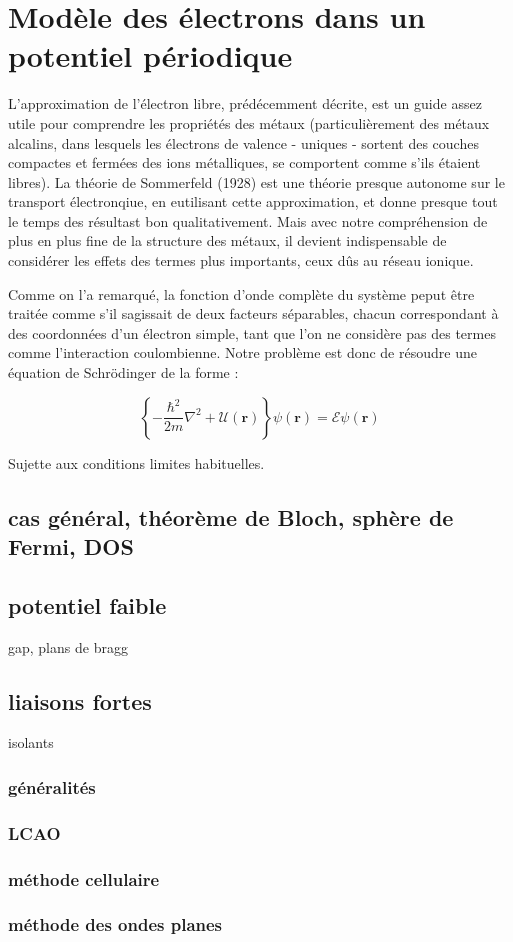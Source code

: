 \chapter{Modèle des électrons dans un potentiel périodique}

L'approximation de l'électron libre, prédécemment décrite, est un guide assez
utile pour comprendre les propriétés des métaux (particulièrement des métaux
    alcalins, dans lesquels les électrons de valence - uniques - sortent des
    couches compactes et fermées des ions métalliques, se comportent comme s'ils
étaient libres). La théorie de Sommerfeld (1928) est une théorie presque autonome
sur le transport électronqiue, en eutilisant cette approximation, et donne
presque tout le temps des résultast bon qualitativement. Mais avec notre
compréhension de plus en plus fine de la structure des métaux, il devient
indispensable de considérer les effets des termes plus importants, ceux dûs au
réseau ionique.

Comme on l'a remarqué, la fonction d'onde complète du système peput être traitée
comme s'il sagissait de deux facteurs séparables, chacun correspondant à des
coordonnées d'un électron simple, tant que l'on ne considère pas des termes comme
l'interaction coulombienne. Notre problème est donc de résoudre une équation de
Schrödinger de la forme :

\begin{equation}
    \left\{ - \frac{\hbar^2}{2m} \nabla^2 + \mathcal{U}(\mathbf{r})\right\}
    \psi(\mathbf{r}) = \mathcal{E}\psi(\mathbf{r})
\end{equation}

Sujette aux conditions limites habituelles.
\section{cas général, théorème de Bloch, sphère de Fermi, DOS}

\section{potentiel faible}
gap, plans de bragg


\section{liaisons fortes}
isolants

\subsection{généralités}
\subsection{LCAO}
\subsection{méthode cellulaire}
\subsection{méthode des ondes planes}
